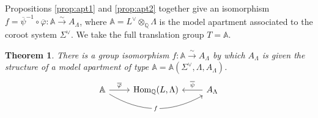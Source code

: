 \documentclass[12pt]{amsart}
\newcommand{\Q}{\mathbb{Q} }
\newcommand{\A}{\mathbb{A}}
\numberwithin{equation}{section}
\newtheorem{theorem}{Theorem}[section]
\theoremstyle{remark} %
\begin{document}
Propositions \ref{prop:apt1} and \ref{prop:apt2} together give an isomorphism $f =  \overline{\psi}^{-1} \circ \overline{\varphi} \colon \A \xrightarrow{\sim} A_{\Lambda} $, where $\A= L^\vee \otimes_\Q \Lambda$ is the model apartment associated to the coroot system $\Sigma^\vee$. We take the full translation group $T=\A$.
\begin{theorem}\label{thm:apt}
	There is a group isomorphism $f \colon \mathbb{A} \xrightarrow{\sim} A_\Lambda$ by which $A_\Lambda$ is given the structure of a model apartment of type $\A=\A(\Sigma^\vee, \Lambda, A_\Lambda)$.
	$$
\begin{tikzcd}
	\mathbb{A} \arrow[r, "\overline{\varphi}"] \arrow[rr, "f" description, bend right] & {\operatorname{Hom}_{\mathbb{Q}}(L,\Lambda)} & A_{\Lambda} \arrow[l, "\overline{\psi}"']
\end{tikzcd}
	$$
\end{theorem}
\end{document}
